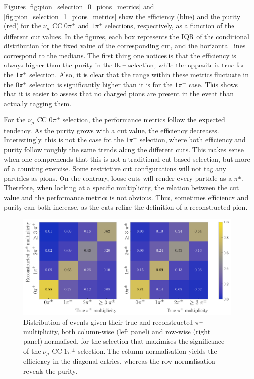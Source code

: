 Figures \ref{fig:pion_selection_0_pions_metrics} and \ref{fig:pion_selection_1_pions_metrics} show the efficiency (blue) and the purity (red) for the $\nu_{\mu}$ CC $0\pi^{\pm}$ and $1\pi^{\pm}$ selections, respectively, as a function of the different cut values. In the figures, each box represents the IQR of the conditional distribution for the fixed value of the corresponding cut, and the horizontal lines correspond to the medians. The first thing one notices is that the efficiency is always higher than the purity in the $0\pi^{\pm}$ selection, while the opposite is true for the $1\pi^{\pm}$ selection. Also, it is clear that the range within these metrics fluctuate in the $0\pi^{\pm}$ selection is significantly higher than it is for the $1\pi^{\pm}$ case. This shows that it is easier to assess that no charged pions are present in the event than actually tagging them.

For the $\nu_{\mu}$ CC $0\pi^{\pm}$ selection, the performance metrics follow the expected tendency. As the purity grows with a cut value, the efficiency decreases. Interestingly, this is not the case fot the $1\pi^{\pm}$ selection, where both efficiency and purity follow roughly the same trends along the different cuts. This makes sense when one comprehends that this is not a traditional cut-based selection, but more of a counting exercise. Some restrictive cut configurations will not tag any particles as pions. On the contrary, loose cuts will render every particle as a $\pi^{\pm}$. Therefore, when looking at a specific multiplicity, the relation between the cut value and the performance metrics is not obvious. Thus, sometimes efficiency and purity can both increase, as the cuts refine the definition of a reconstructed pion.

\begin{figure}[t]
    \centering
    \includegraphics[width=.99\linewidth]{Images/GAr_selection/pion_selection_metrics_matrix_max_significance.pdf}
    \caption[Row and column normalised distributions of events given their true and reconstructed $\pi^{\pm}$ multiplicity, for the selection that maximises the significance of the $\nu_{\mu}$ CC $1\pi^{\pm}$ selection.]{Distribution of events given their true and reconstructed $\pi^{\pm}$ multiplicity, both column-wise (left panel) and row-wise (right panel) normalised, for the selection that maximises the significance of the $\nu_{\mu}$ CC $1\pi^{\pm}$ selection. The column normalisation yields the efficiency in the diagonal entries, whereas the row normalisation reveals the purity.}
    \label{fig:pion_selection_metrics}
\end{figure}


